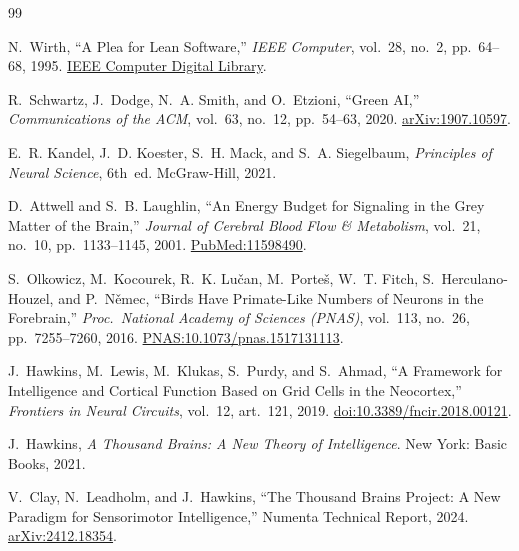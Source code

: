 \documentclass[10pt,a4paper]{article}
\begin{document}
\begin{thebibliography}{99}\footnotesize\setlength{\itemsep}{2.2pt}\setlength{\parskip}{0pt}

N.~Wirth, ``A Plea for Lean Software,'' \textit{IEEE Computer}, vol.~28, no.~2, pp.~64--68, 1995. \href{https://www.computer.org/csdl/magazine/co/1995/02/r2064/13rRUwInv7E}{IEEE Computer Digital Library}.

R.~Schwartz, J.~Dodge, N.~A. Smith, and O.~Etzioni, ``Green AI,'' \textit{Communications of the ACM}, vol.~63, no.~12, pp.~54--63, 2020. \href{https://arxiv.org/abs/1907.10597}{arXiv:1907.10597}.

E.~R. Kandel, J.~D. Koester, S.~H. Mack, and S.~A. Siegelbaum, \textit{Principles of Neural Science}, 6th~ed. McGraw-Hill, 2021.

D.~Attwell and S.~B. Laughlin, ``An Energy Budget for Signaling in the Grey Matter of the Brain,'' \textit{Journal of Cerebral Blood Flow \& Metabolism}, vol.~21, no.~10, pp.~1133--1145, 2001. \href{https://pubmed.ncbi.nlm.nih.gov/11598490/}{PubMed:11598490}.

S.~Olkowicz, M.~Kocourek, R.~K. Lu\v{c}an, M.~Porte\v{s}, W.~T. Fitch, S.~Herculano-Houzel, and P.~N\v{e}mec, ``Birds Have Primate-Like Numbers of Neurons in the Forebrain,'' \textit{Proc.\ National Academy of Sciences (PNAS)}, vol.~113, no.~26, pp.~7255--7260, 2016. \href{https://www.pnas.org/doi/10.1073/pnas.1517131113}{PNAS:10.1073/pnas.1517131113}.

J.~Hawkins, M.~Lewis, M.~Klukas, S.~Purdy, and S.~Ahmad, ``A Framework for Intelligence and Cortical Function Based on Grid Cells in the Neocortex,'' \textit{Frontiers in Neural Circuits}, vol.~12, art.~121, 2019. \href{https://www.frontiersin.org/journals/neural-circuits/articles/10.3389/fncir.2018.00121/full}{doi:10.3389/fncir.2018.00121}.

J.~Hawkins, \textit{A Thousand Brains: A New Theory of Intelligence}. New York: Basic Books, 2021.

V.~Clay, N.~Leadholm, and J.~Hawkins, ``The Thousand Brains Project: A New Paradigm for Sensorimotor Intelligence,'' Numenta Technical Report, 2024. \href{https://arxiv.org/abs/2412.18354}{arXiv:2412.18354}.


\end{thebibliography}
\end{document}
